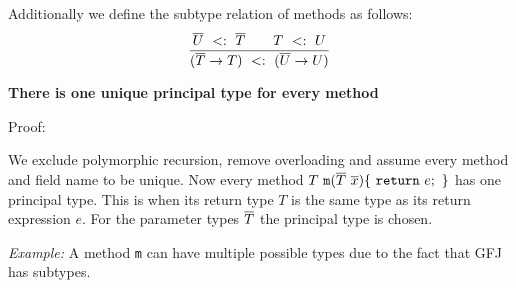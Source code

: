 \documentclass[acmsmall,screen,review]{acmart}
\begin{document}
Additionally we define the subtype relation of methods as follows:
\begin{align*}
\frac{\displaystyle 
\overline{U} \ <: \ \overline{T} \quad \quad T \ <: \ U
}{\displaystyle 
(\overline{T} \to T) \ <: \ (\overline{U} \to U)
}
\end{align*}



\begin{theoremAndi}
  \label{theo:uniquePrincipalType}
  \textbf{There is one unique principal type for every method}
\end{theoremAndi}
Proof:

We exclude polymorphic recursion, remove overloading and assume every method and field name to be unique.
Now every method $T\ \texttt{m}(\ol{T}\ \ol{x})\{\ \texttt{return}\ e;\ \}$ has one principal type.
This is when its return type $T$ is the same type as its return expression $e$.
For the parameter types $\overline{T}$ the principal type is chosen.

\textit{Example:}
A method \texttt{m} can have multiple possible types due to the fact that GFJ has subtypes.
\end{document}
